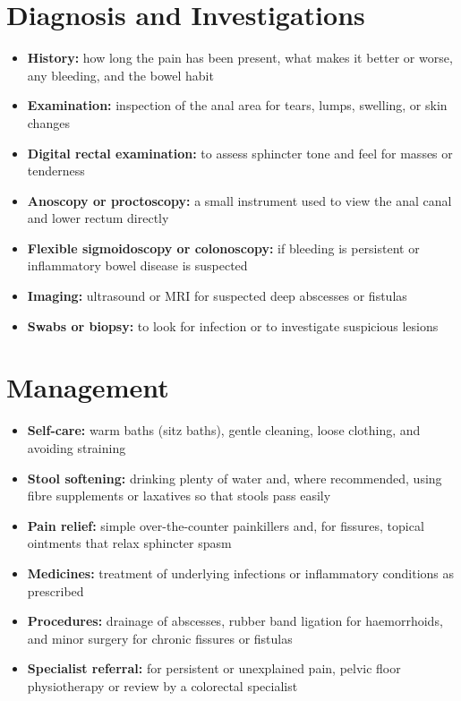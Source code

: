 \section*{Diagnosis and Investigations}
\begin{itemize}
    \item \textbf{History:} how long the pain has been present, what makes it better or worse, any bleeding, and the bowel habit
    \item \textbf{Examination:} inspection of the anal area for tears, lumps, swelling, or skin changes
    \item \textbf{Digital rectal examination:} to assess sphincter tone and feel for masses or tenderness
    \item \textbf{Anoscopy or proctoscopy:} a small instrument used to view the anal canal and lower rectum directly
    \item \textbf{Flexible sigmoidoscopy or colonoscopy:} if bleeding is persistent or inflammatory bowel disease is suspected
    \item \textbf{Imaging:} ultrasound or MRI for suspected deep abscesses or fistulas
    \item \textbf{Swabs or biopsy:} to look for infection or to investigate suspicious lesions
\end{itemize}

\section*{Management}
\begin{itemize}
    \item \textbf{Self-care:} warm baths (sitz baths), gentle cleaning, loose clothing, and avoiding straining
    \item \textbf{Stool softening:} drinking plenty of water and, where recommended, using fibre supplements or laxatives so that stools pass easily
    \item \textbf{Pain relief:} simple over-the-counter painkillers and, for fissures, topical ointments that relax sphincter spasm
    \item \textbf{Medicines:} treatment of underlying infections or inflammatory conditions as prescribed
    \item \textbf{Procedures:} drainage of abscesses, rubber band ligation for haemorrhoids, and minor surgery for chronic fissures or fistulas
    \item \textbf{Specialist referral:} for persistent or unexplained pain, pelvic floor physiotherapy or review by a colorectal specialist
\end{itemize}

